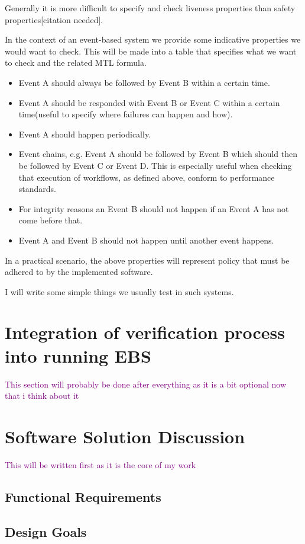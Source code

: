 \documentclass{article}
\newcommand{\note}[1] {
	\textcolor{Purple}{#1}

}
\begin{document}
Generally it is more difficult to specify and check liveness properties than safety properties[citation needed].


In the context of an event-based system we provide some indicative properties we would want to check. This will be made into a table that specifies what we want to check and the related MTL formula.
\begin{itemize}
	\item Event A should always be followed by Event B within a certain time.
	\item Event A should be responded with Event B or Event C within a certain time(useful to specify where failures can happen and how).
	\item Event A should happen periodically.
	\item Event chains, e.g. Event A should be followed by Event B which should then be followed by Event C or Event D. This is especially useful when checking that execution of workflows, as defined above, conform to performance standards.
	\item For integrity reasons an Event B should not happen if an Event A has not come before that.
	\item Event A and Event B should not happen until another event happens.
\end{itemize}
In a practical scenario, the above properties will represent policy that must be adhered to by the implemented software.

I will write some simple things we usually test in such systems.

\section{Integration of verification process into running EBS}
\note{This section will probably be done after everything as it is a bit optional now that i think about it}
\section{Software Solution Discussion}
\note{This will be written first as it is the core of my work}
\subsection{Functional Requirements}
\subsection{Design Goals}
\end{document}
